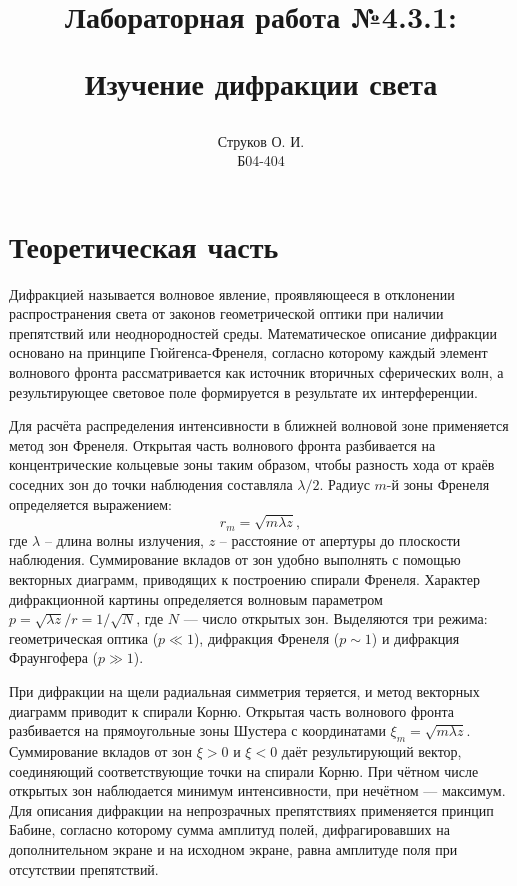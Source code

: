 \documentclass[12pt,a4paper]{article}
\begin{document}
\title{\begin{center}Лабораторная работа №4.3.1:\end{center}
Изучение дифракции света}
\author{Струков О. И. \\ Б04-404}
\date{}

\thispagestyle{empty}
\maketitle
\newpage
{}

\section*{Теоретическая часть}
Дифракцией называется волновое явление, проявляющееся в отклонении распространения света от законов геометрической оптики при наличии препятствий или неоднородностей среды. Математическое описание дифракции основано на принципе Гюйгенса-Френеля, согласно которому каждый элемент волнового фронта рассматривается как источник вторичных сферических волн, а результирующее световое поле формируется в результате их интерференции.

Для расчёта распределения интенсивности в ближней волновой зоне применяется метод зон Френеля. Открытая часть волнового фронта разбивается на концентрические кольцевые зоны таким образом, чтобы разность хода от краёв соседних зон до точки наблюдения составляла $\lambda/2$. Радиус $m$-й зоны Френеля определяется выражением:
\begin{equation}
r_m = \sqrt{m \lambda z},
\end{equation}
где $\lambda$ -- длина волны излучения, $z$ -- расстояние от апертуры до плоскости наблюдения. Суммирование вкладов от зон удобно выполнять с помощью векторных диаграмм, приводящих к построению спирали Френеля. Характер дифракционной картины определяется волновым параметром $p = \sqrt{\lambda z}/r = 1/\sqrt{N}$, где $N$ --- число открытых зон. Выделяются три режима: геометрическая оптика ($p \ll 1$), дифракция Френеля ($p \sim 1$) и дифракция Фраунгофера ($p \gg 1$).

При дифракции на щели радиальная симметрия теряется, и метод векторных диаграмм приводит к спирали Корню. Открытая часть волнового фронта разбивается на прямоугольные зоны Шустера с координатами $\xi_m = \sqrt{m\lambda z}$. Суммирование вкладов от зон $\xi > 0$ и $\xi < 0$ даёт результирующий вектор, соединяющий соответствующие точки на спирали Корню. При чётном числе открытых зон наблюдается минимум интенсивности, при нечётном --- максимум. Для описания дифракции на непрозрачных препятствиях применяется принцип Бабине, согласно которому сумма амплитуд полей, дифрагировавших на дополнительном экране и на исходном экране, равна амплитуде поля при отсутствии препятствий.
\end{document}
